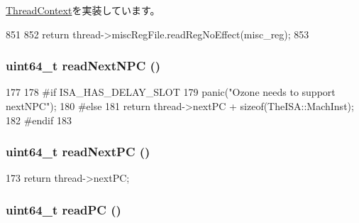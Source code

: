 \hyperlink{classThreadContext_a93c9c97261cb7289d5976b8222f70c4c}{ThreadContext}を実装しています。


\begin{DoxyCode}
851 {
852     return thread->miscRegFile.readRegNoEffect(misc_reg);
853 }
\end{DoxyCode}
\hypertarget{classOzoneCPU_1_1OzoneTC_a1c4619d610f95bf0728b5bfb0333507c}{
\subsubsection[{readNextNPC}]{\setlength{\rightskip}{0pt plus 5cm}uint64\_\-t readNextNPC ()}}
\label{classOzoneCPU_1_1OzoneTC_a1c4619d610f95bf0728b5bfb0333507c}



\begin{DoxyCode}
177         {
178 #if ISA_HAS_DELAY_SLOT
179             panic("Ozone needs to support nextNPC");
180 #else
181             return thread->nextPC + sizeof(TheISA::MachInst);
182 #endif
183         }
\end{DoxyCode}
\hypertarget{classOzoneCPU_1_1OzoneTC_acac7689eb460c7ab0e23797c198b7028}{
\subsubsection[{readNextPC}]{\setlength{\rightskip}{0pt plus 5cm}uint64\_\-t readNextPC ()}}
\label{classOzoneCPU_1_1OzoneTC_acac7689eb460c7ab0e23797c198b7028}



\begin{DoxyCode}
173 { return thread->nextPC; }
\end{DoxyCode}
\hypertarget{classOzoneCPU_1_1OzoneTC_a30cb2afdfdc1383b7804c167dcf5ee78}{
\subsubsection[{readPC}]{\setlength{\rightskip}{0pt plus 5cm}uint64\_\-t readPC ()}}
\label{classOzoneCPU_1_1OzoneTC_a30cb2afdfdc1383b7804c167dcf5ee78}



